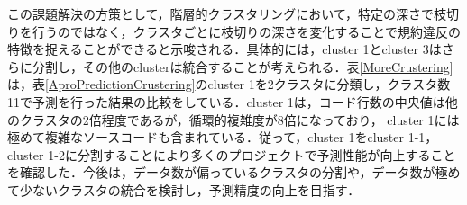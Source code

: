 \documentclass[T,J]{fose} %
\begin{document}
\begin{table}[t]
    \caption{クラスタ数の変化による予測精度への影響}
    \label{MoreCrustering}
\end{table}


この課題解決の方策として，階層的クラスタリングにおいて，特定の深さで枝切りを行うのではなく，クラスタごとに枝切りの深さを変化することで規約違反の特徴を捉えることができると示唆される．具体的には，cluster 1とcluster 3はさらに分割し，その他のclusterは統合することが考えられる．表\ref{MoreCrustering}は，表\ref{AproPredictionCrustering}のcluster 1を2クラスタに分類し，クラスタ数11で予測を行った結果の比較をしている．cluster 1は，コード行数の中央値は他のクラスタの2倍程度であるが，循環的複雑度が8倍になっており，
cluster 1には極めて複雑なソースコードも含まれている．従って，cluster 1をcluster 1-1，cluster 1-2に分割することにより多くのプロジェクトで予測性能が向上することを確認した．今後は，データ数が偏っているクラスタの分割や，データ数が極めて少ないクラスタの統合を検討し，予測精度の向上を目指す．
\end{document}
